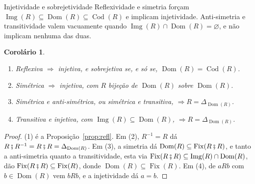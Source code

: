 \documentclass[10pt]{beamer}
\newcommand{\passo}{\onslide<+->}
\newcommand{\diag}[1]{\Delta_{#1}}
\newcommand{\inv}[1]{{#1}^{-1}}
\newcommand{\Fix}{\operatorname{Fix}}
\newcommand{\Img}{\operatorname{Img}}
\newcommand{\Dom}{\operatorname{Dom}}
\newcommand{\Cod}{\operatorname{Cod}}
\newcommand{\comp}{\mathbin{\fatsemi}}
\newtheorem{cor}{Corolário}
\begin{document}
	\begin{frame}{Injetividade e sobrejetividade}
		\passo
		Reflexividade e simetria forçam $\Img(R) \subseteq \Dom(R) \subseteq \Cod(R)$ e implicam
		injetividade. Anti-simetria e transitividade valem vacuamente quando
		$\Img(R) \cap \Dom(R) = \varnothing$, e não implicam nenhuma das duas.
		
		\passo
		\begin{cor}
			\begin{enumerate}
				\item<+-> Reflexiva $\Rightarrow$ injetiva, e sobrejetiva se, e só se, $\Dom(R) = \Cod(R)$.
				\item<+-> Simétrica $\Rightarrow$ injetiva, com $R$ bijeção de $\Dom(R)$ sobre $\Dom(R)$.
				\item<+-> Simétrica e anti-simétrica, ou simétrica e transitiva, $\Rightarrow R = \diag{\Dom(R)}$.
				\item<+-> Transitiva e injetiva, com $\Img(R) \subseteq \Dom(R)$, $\Rightarrow R = \diag{\Dom(R)}$.
			\end{enumerate}
		\end{cor}
		
		\passo
		\begin{proof}
			(1) é a Proposição~\ref{prop:refl}. Em (2), $\inv{R} = R$ dá
			$R \comp \inv{R} = R \comp R = \diag{\Dom(R)}$.
			Em (3), a simetria dá $\Dom(R) \subseteq \Fix(R \comp R)$, e tanto a anti-simetria quanto
			a transitividade, esta via $\Fix(R \comp R) \subseteq \Img(R) \cap \Dom(R)$, dão
			$\Fix(R \comp R) \subseteq \Fix(R)$, donde $\Dom(R) \subseteq \Fix(R)$.
			Em (4), de $aRb$ com $b \in \Dom(R)$ vem $bRb$, e a injetividade dá $a = b$.
		\end{proof}
	\end{frame}
	
\end{document}
